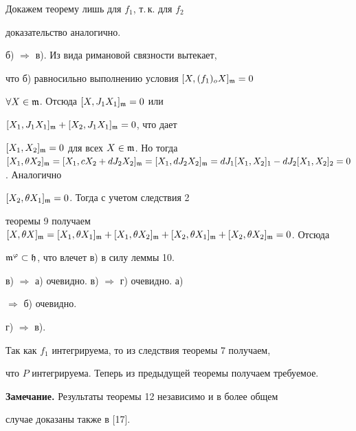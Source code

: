 \begin{pf}


Докажем теорему лишь для $f_1$, т.\,к. для $f_2$


доказательство аналогично.





б) $\Longrightarrow$ в). Из вида римановой связности вытекает,


что б) равносильно выполнению условия $[X,(f_1)_oX]_{\frak{m}}=0$


$\forall X \in \frak{m}$. Отсюда $[X,J_1X_1]_{\frak{m}}=0$ или


$[X_1,J_1X_1]_{\frak{m}}+[X_2,J_1X_1]_{\frak{m}}=0$, что дает


$[X_1,X_2]_{\frak{m}}=0$ для всех $X \in \frak{m}$. Но тогда $[X


_1,\theta X_2]_{\frak{m}}=[X_1,cX_2+dJ_2X_2]_{\frak{m}}=[X_1,dJ_


2X_2]_{\frak{m}}=dJ_1[X_1,X_2]_1- dJ_2[X_1,X_2]_2=0$. Аналогично


$[X_2,\theta X_1]_{\frak{m}}=0$. Тогда с учетом следствия 2


теоремы 9 получаем $[X,\theta X]_{\frak{m}}=[X_1,\theta


X_1]_{\frak{m}}+ [X_1,\theta X_2]_{\frak{m}}+


[X_2,\theta X_1]_{\frak{m}}+[X_2,\theta X_2]_{\frak{m}}=0$. Отсюда


$\frak{m}^\varphi \subset \frak{h}$, что влечет в) в силу леммы 10.





в) $\Longrightarrow$ а) очевидно. в) $\Longrightarrow$ г) очевидно. а)


$\Longrightarrow$ б) очевидно.





г) $\Longrightarrow$ в). 


Так как $f_1$ интегрируема, то из следствия теоремы 7 получаем, 


что $P$ интегрируема. Теперь из предыдущей теоремы получаем требуемое.


\end{pf}





{\bf Замечание.} Результаты теоремы 12 независимо и в более общем


случае доказаны также в [17].





